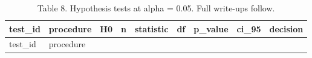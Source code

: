 \documentclass[
]{article}
\begin{document}
\begin{longtable}[]{@{}
  >{\raggedleft\arraybackslash}p{}
  >{\raggedright\arraybackslash}p{}
  >{\raggedright\arraybackslash}p{}
  >{\raggedright\arraybackslash}p{}
  >{\raggedleft\arraybackslash}p{}
  >{\raggedleft\arraybackslash}p{}
  >{\raggedright\arraybackslash}p{}
  >{\raggedright\arraybackslash}p{}
  >{\raggedright\arraybackslash}p{}@{}}
\caption{Table 8. Hypothesis tests at alpha = 0.05. Full write-ups
follow.}\tabularnewline
\toprule\noalign{}
\begin{minipage}[b]{\linewidth}\raggedleft
test\_id
\end{minipage} & \begin{minipage}[b]{\linewidth}\raggedright
procedure
\end{minipage} & \begin{minipage}[b]{\linewidth}\raggedright
H0
\end{minipage} & \begin{minipage}[b]{\linewidth}\raggedright
n
\end{minipage} & \begin{minipage}[b]{\linewidth}\raggedleft
statistic
\end{minipage} & \begin{minipage}[b]{\linewidth}\raggedleft
df
\end{minipage} & \begin{minipage}[b]{\linewidth}\raggedright
p\_value
\end{minipage} & \begin{minipage}[b]{\linewidth}\raggedright
ci\_95
\end{minipage} & \begin{minipage}[b]{\linewidth}\raggedright
decision
\end{minipage} \\
\midrule\noalign{}
\endfirsthead
\toprule\noalign{}
\begin{minipage}[b]{\linewidth}\raggedleft
test\_id
\end{minipage} & \begin{minipage}[b]{\linewidth}\raggedright
procedure
\end{minipage} & \begin{minipage}[b]{\linewidth}\raggedright

\end{minipage}
\end{longtable}
\end{document}
